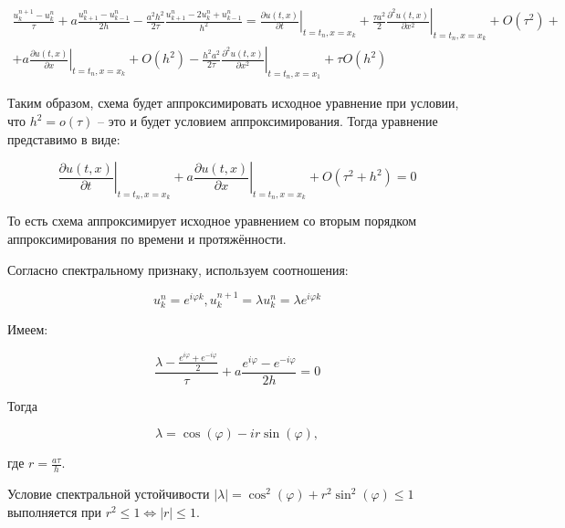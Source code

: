\documentclass[14pt,a4paper]{scrartcl}
\begin{document}
	\begin{equation*}
		\begin{array}{l}
			\frac{u_{k}^{n+1}-u_{k}^{n}}{\tau}+a \frac{u_{k+1}^{n}-u_{k-1}^{n}}{2 h}-\frac{a^{2} h^{2}}{2 \tau} \frac{u_{k+1}^{n}-2 u_{k}^{n}+u_{k-1}^{n}}{h^{2}}=\left.\frac{\partial u(t, x)}{\partial t}\right|_{t=t_{n}, x=x_{k}}+\left.\frac{\tau a^{2}}{2} \frac{\partial^{2} u(t, x)}{\partial x^{2}}\right|_{t=t_n, x=x_{k}}+O\left(\tau^{2}\right)+ \\
			+\left.a \frac{\partial u(t, x)}{\partial x}\right|_{t=t_{n}, x=x_{k}}+O\left(h^{2}\right)-\left.\frac{h^{2} a^{2}}{2 \tau} \frac{\partial^{2} u(t, x)}{\partial x^{2}}\right|_{t=t_{n}, x=x_{1}}+\tau O\left(h^{2}\right)
		\end{array}
	\end{equation*}
	
	
	Таким образом, схема будет аппроксимировать исходное уравнение при условии, что $h^2 = o(\tau)$ -- это и будет условием аппроксимирования. Тогда уравнение представимо в виде:
	
	\begin{equation*}
		\left.\frac{\partial u(t, x)}{\partial t}\right|_{t=t_{n}, x=x_{k}}+\left.a \frac{\partial u(t, x)}{\partial x}\right|_{t=t_{n}, x=x_{k}}+O\left(\tau^{2}+h^{2}\right)=0
	\end{equation*}
	
	
	То есть схема аппроксимирует исходное уравнением со вторым порядком аппроксимирования по времени и протяжённости.
	
	Согласно спектральному признаку, используем соотношения:
	
	\begin{equation*}
		u_{k}^{n}=e^{i \varphi k}, u_{k}^{n+1}=\lambda u_{k}^{n}=\lambda e^{i \varphi k}
	\end{equation*}
	
	
	Имеем:
	
	\begin{equation*}
		\frac{\lambda-\frac{e^{i \varphi}+e^{-i \varphi}}{2}}{\tau}+a \frac{e^{i \varphi}-e^{-i \varphi}}{2 h}=0
	\end{equation*}
	
	
	Тогда
	
	\begin{equation*}
		\lambda = \cos(\varphi) - i r \sin(\varphi),
	\end{equation*}
	
	где $r = \frac{a\tau}{h}$.
	
	Условие спектральной устойчивости $|\lambda| = \cos^2(\varphi) + r^2 \sin^2(\varphi) \leq 1$ выполняется при $r^2 \leq 1 \Leftrightarrow |r| \leq 1$.
	
\end{document}
